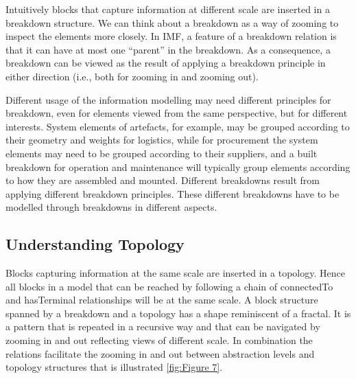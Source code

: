 \documentclass[../main.tex]{subfiles}
\begin{document}
Intuitively blocks that capture information at different scale are
inserted in a breakdown structure.  
We can think about a  breakdown as a way of zooming  to inspect the elements more closely. In IMF, a feature of a breakdown relation is that it can have at most one “parent” in the breakdown. As a consequence, a breakdown can be viewed as the result of applying a breakdown principle in either direction (i.e., both for zooming in and zooming out). 

Different usage of the information modelling may need different principles for breakdown, even for elements viewed from the same perspective, but for different interests. 
System elements of artefacts, for example, may be grouped according to their geometry and weights for logistics, while for procurement the system elements may need to be grouped according to their suppliers, and a built breakdown for operation and maintenance will typically group elements according to how they are assembled and mounted. Different breakdowns result from applying different breakdown principles. These different breakdowns have to be modelled through breakdowns in different aspects. 

\subsection{Understanding Topology}
Blocks capturing information at the same scale are inserted in a topology. 
Hence
all blocks in a model that can be reached by following a chain of connectedTo and hasTerminal relationships will be at the same scale. 
A block
structure spanned by a breakdown and a topology has a shape reminiscent of a fractal. It is a pattern that is
repeated in a recursive way and that can be navigated by zooming in and out reflecting views of different scale. In combination the relations facilitate the zooming in and out between abstraction levels and topology structures that is illustrated \autoref{fig:Figure 7}.




\end{document}
